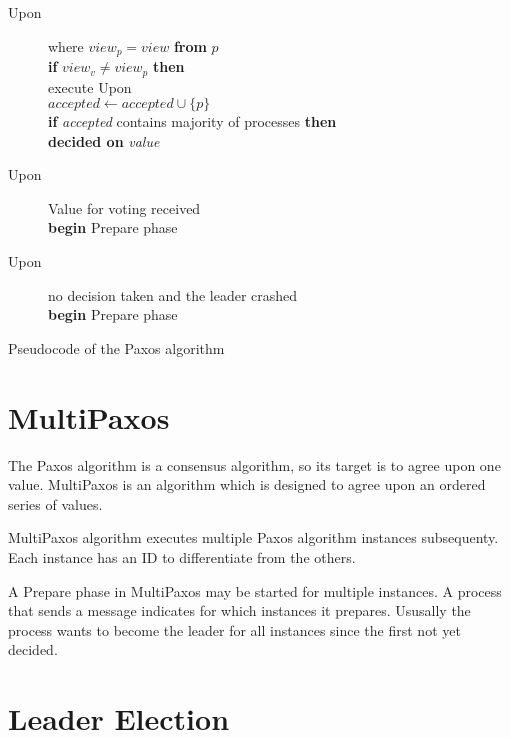 \begin{table}
\begin{description}
 \vspace{-0.5em}
 \item[Upon]  where $\textit{view}_p = \textit{view}$ \textbf{from} $p$ \\
   \textbf{if} $\textit{view}_v \neq \textit{view}_p$ \textbf{then} \\
     \hspace*{\defaultParIndent} execute Upon  \\
   $\textit{accepted} \leftarrow \textit{accepted} \cup \{ p \} $ \\
   \textbf{if} \textit{accepted} contains majority of processes \textbf{then} \\
     \hspace*{\defaultParIndent} \textbf{decided on} \textit{value}

 \vspace{-0.5em}
 \item[Upon] Value for voting received \\
   \textbf{begin} Prepare phase

 \vspace{-0.5em}
 \item[Upon] no decision taken and the leader crashed \\
   \textbf{begin} Prepare phase

\end{description}
\caption{Pseudocode of the Paxos algorithm}
\label{table:paxosAlgorithm}
\end{table}

\section{MultiPaxos}

The Paxos algorithm is a consensus algorithm, so its target is to agree upon one value. MultiPaxos is an algorithm which is designed to agree upon an ordered series of values.

MultiPaxos algorithm executes multiple Paxos algorithm instances subsequenty. Each instance has an ID to differentiate from the others.

A Prepare phase in MultiPaxos may be started for multiple instances. A process that sends a \prepare message indicates for which instances it prepares. Ususally the process wants to become the leader for all instances since the first not yet decided.

\section{Leader Election}
\label{sec:leader_election}

